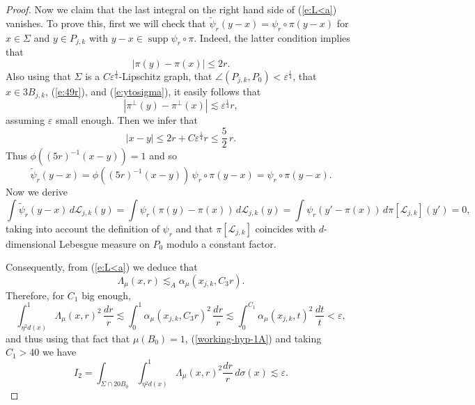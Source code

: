 \documentclass[11pt]{amsart}
\newcommand{\LL}{{\mathcal L}}
\newcommand{\rf}[1]{{(\ref{#1})}}
\newcommand{\supp}{\operatorname{supp}}
\newcommand{\ve}{{\varepsilon}}
\newcommand{\wt}[1]{{\widetilde{#1}}}
\theoremstyle{definition}
\theoremstyle{remark}
\numberwithin{equation}{section}
\def\lec{\lesssim}
\def\lec{\lesssim}
\begin{document}
\begin{proof}
Now we claim that the last integral on the right hand side of \rf{e:L<a} vanishes. To prove this, first we will check that $\wt{\psi}_{r}(y-x) =\psi_r\circ\pi(y-x)$ for $x\in\Sigma$ and $y\in P_{j,k}$ with
$y-x\in\supp{\psi}_{r}\circ\pi$. Indeed, the latter condition implies that
$$|\pi(y)-\pi(x)|\leq 2r.$$
Also using that $\Sigma$ is a $C\ve^{\frac14}$-Lipschitz graph, that $\angle(P_{j,k},P_{0})<\ve^{\frac{1}{4}}$, that
$x\in 3B_{j,k}$, \rf{e:49r}, and \rf{e:ytosigma}, it easily follows that
$$|\pi^\perp(y)-\pi^\perp(x)|\lesssim\ve^{\frac14}r,$$
assuming $\ve$ small enough.
Then we infer that
$$|x-y|\leq 2r + C\ve^{\frac14}r\leq \frac52\,r.$$
Thus $\phi((5r)^{-1}(x-y))=1$ and so
$$\wt{\psi}_{r}(y-x) =\phi((5r)^{-1}(x-y))\,\psi_r\circ\pi(y-x) = \psi_r\circ\pi(y-x).$$
Now we derive
\begin{equation}\label{8.10A}
\int \wt{\psi}_{r}(y-x) \, d\LL_{j,k}(y) =
\int \psi_{r}(\pi(y)-\pi(x)) \, d\LL_{j,k}(y) = \int \psi_{r}(y'-\pi(x)) \, d\pi[\LL_{j,k}](y')=0,
\end{equation}
taking into account the definition of $\psi_r$ and that $\pi[\LL_{j,k}]$ coincides with $d$-dimensional
Lebesgue measure on $P_0$ modulo a constant factor. 

Consequently, from \rf{e:L<a} we deduce that
$$\Lambda_{\mu}(x,r)\lesssim_A \alpha_{\mu}(x_{j,k},C_3r).$$
Therefore, for $C_1$ big enough,
\[
 \int_{\eta^2 d(x)}^{1} \Lambda_{ \mu}(x,r)^{2}\,\frac{dr}{r} \lesssim \int_{0}^{1} \alpha_{\mu}(x_{j,k},C_3r)^{2}\, \frac{dr}{r}  
\lec \int_{0}^{C_{1}}\alpha_{\mu}(x_{j,k},t)^{2} \,\frac{dt}{t}  
< \ve,\]
and thus using that fact that $\mu(B_0)=1$, \rf{working-hyp-1A} and taking $C_1>40$ we have
$$I_2 = \int_{\Sigma \cap 20 B_0}\int_{\eta^2 d(x)}^{1} \!\Lambda_{ \mu}(x,r)^{2}\frac{dr}{r}\,d\sigma(x)  \lesssim \ve.$$

% 


\end{proof}
\end{document}
